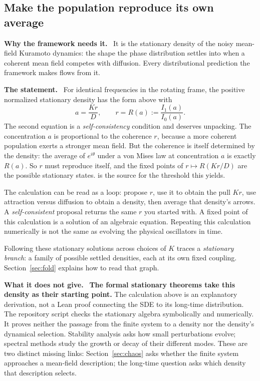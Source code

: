 \documentclass[11pt]{article}
\newcommand{\why}{\par\smallskip\noindent\textbf{Why the framework needs it.}\ }
\newcommand{\statement}{\par\smallskip\noindent\textbf{The statement.}\ }
\newcommand{\scope}{\par\smallskip\noindent\textbf{What it does not give.}\ }
\newcommand{\id}[1]{{\small\ttfamily\seqsplit{#1}}}
\begin{document}
\subsection{Make the population reproduce its own average}

\why
It is the stationary density of the noisy mean-field Kuramoto dynamics: the
shape the phase distribution settles into when a coherent mean field competes
with diffusion. Every distributional prediction the framework makes flows from
it.

\statement
For identical frequencies in the rotating frame, the positive normalized
stationary density has the form above with
\begin{equation}
 a=\frac{Kr}{D},\qquad r=R(a):=\frac{I_1(a)}{I_0(a)} .
 \label{eq:selfcons}
\end{equation}
The second equation is a \emph{self-consistency} condition and deserves
unpacking. The concentration $a$ is proportional to the coherence $r$, because
a more coherent population exerts a stronger mean field. But the coherence is
itself determined by the density: the average of $e^{i\theta}$ under a von
Mises law at concentration $a$ is exactly $R(a)$. So $r$ must reproduce
itself, and the fixed points of $r\mapsto R(Kr/D)$ are the possible
stationary states. \citet{sakaguchi1988} is the source for the threshold this
yields.

The calculation can be read as a loop: propose $r$, use it to obtain the
pull $Kr$, use attraction versus diffusion to obtain a density, then average
that density's arrows. A \emph{self-consistent} proposal returns the same $r$
you started with. A fixed point of this calculation is a solution of an
algebraic equation. Repeating this calculation numerically is not the same
as evolving the physical oscillators in time.

Following these stationary solutions across choices of $K$ traces a
\emph{stationary branch}: a family of possible settled densities, each at its
own fixed coupling. Section~\ref{sec:fold} explains how to read that graph.

\scope
\textbf{The formal stationary theorems take this density as their starting
point.} The calculation above is an explanatory derivation, not a Lean proof
connecting the SDE to its long-time distribution. The repository script
\id{simulations/fokker\_planck\_von\_mises.py} checks the stationary algebra
symbolically and numerically. It proves neither the passage from the finite
system to a density nor the density's dynamical selection. Stability analysis
asks how small perturbations evolve; spectral methods study the growth or
decay of their different modes. These are two distinct missing links:
Section~\ref{sec:chaos} asks whether the finite system approaches a mean-field
description; the long-time question asks which density that description selects.
\end{document}
